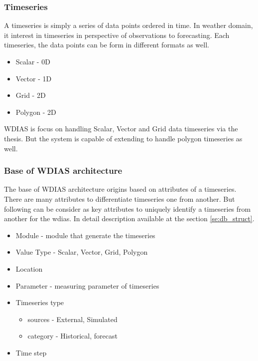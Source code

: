 \subsubsection{Timeseries}
A timeseries is simply a series of data points ordered in time. In weather domain, it interest in timeseries in perspective of observations to forecasting.
Each timeseries, the data points can be form in different formats as well.
\begin{itemize} 
    \item Scalar - 0D
    \item Vector - 1D
    \item Grid - 2D
    \item Polygon - 2D
\end{itemize}
    
WDIAS is focus on handling Scalar, Vector and Grid data timeseries via the thesis. But the system is capable of extending to handle polygon timeseries as well.

\subsubsection{Base of WDIAS architecture}
The base of WDIAS architecture origins based on attributes of a timeseries. There are many attributes to differentiate timeseries one from another. But following can be consider as key attributes to uniquely identify a timeseries from another for the \acrshort{wdias}. In detail description available at the section \ref{se:db_struct}.
\begin{itemize}
    \item Module - module that generate the timeseries
    \item Value Type - Scalar, Vector, Grid, Polygon
    \item Location 
    \item Parameter - measuring parameter of timeseries
    \item Timeseries type
    \begin{itemize}
        \item sources - External, Simulated
        \item category - Historical, forecast
    \end{itemize}
    \item Time step
\end{itemize}
